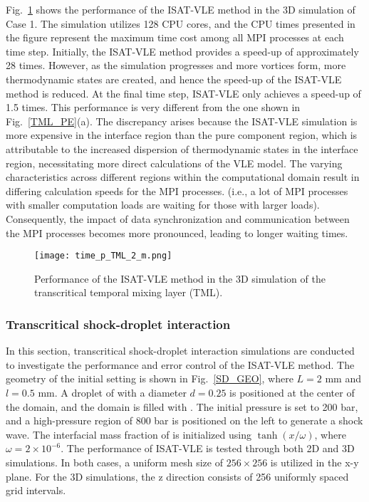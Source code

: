 Fig.~\ref{TML_3D_performace} shows the performance of the ISAT-VLE method in the 3D simulation of Case 1. The simulation utilizes 128 CPU cores, and the CPU times presented in the figure represent the maximum time cost among all MPI processes at each time step. Initially, the ISAT-VLE method provides a speed-up of approximately 28 times. However, as the simulation progresses and more vortices form, more thermodynamic states are created, and hence the speed-up of the ISAT-VLE method is reduced. At the final time step, ISAT-VLE only achieves a speed-up of 1.5 times. This performance is very different from the one shown in Fig.~\ref{TML_PE}(a). The discrepancy arises because the ISAT-VLE simulation is more expensive in the interface region than the pure component region, which is attributable to the increased dispersion of thermodynamic states in the interface region, necessitating more direct calculations of the VLE model. The varying characteristics across different regions within the computational domain result in differing calculation speeds for the MPI processes. (i.e., a lot of MPI processes with smaller computation loads are waiting for those with larger loads). Consequently, the impact of data synchronization and communication between the MPI processes becomes more pronounced, leading to longer waiting times. %

\begin{figure}[htbp]
	\centering
	\texttt{[image: time\_p\_TML\_2\_m.png]}
	\caption{Performance of the ISAT-VLE method in the 3D simulation of the transcritical temporal mixing layer (TML).}
	\label{TML_3D_performace}
\end{figure}


\subsubsection{Transcritical shock-droplet interaction}
\label{sec:SD}

In this section, transcritical shock-droplet interaction simulations are conducted to investigate the performance and error control of the ISAT-VLE method. The geometry of the initial setting is shown in Fig.~\ref{SD_GEO}, where $L=2$ mm and $l=0.5$ mm. A droplet of  with a diameter $d=0.25$ is positioned at the center of the domain, and the domain is filled with . The initial pressure is set to 200 bar, and a high-pressure region of 800 bar is positioned on the left to generate a shock wave. The interfacial mass fraction of  is initialized using $\tanh(x/\omega)$, where $\omega=2 \times 10^{-6}$. The performance of ISAT-VLE is tested through both 2D and 3D simulations. In both cases, a uniform mesh size of $256\times256$ is utilized in the x-y plane. For the 3D simulations, the z direction consists of 256 uniformly spaced grid intervals.


